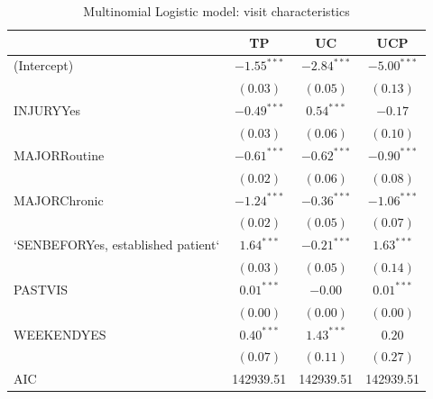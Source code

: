 \documentclass[12pt,twoside]{reedthesis}
\begin{document}
  \begin{table}
  \caption{Multinomial Logistic model: visit characteristics}
  \begin{center}
  \begin{scriptsize}
  \begin{tabular}{l@{} c@{} c@{} c@{} }
  \toprule
   & TP & UC & UCP \\
  \midrule
  (Intercept)                        & $\mathbf{-1.55}^{***}$ & $\mathbf{-2.84}^{***}$ & $\mathbf{-5.00}^{***}$ \\
                                     & $(0.03)$               & $(0.05)$               & $(0.13)$               \\
  INJURYYes                          & $\mathbf{-0.49}^{***}$ & $\mathbf{0.54}^{***}$  & $-0.17$                \\
                                     & $(0.03)$               & $(0.06)$               & $(0.10)$               \\
  MAJORRoutine                       & $\mathbf{-0.61}^{***}$ & $\mathbf{-0.62}^{***}$ & $\mathbf{-0.90}^{***}$ \\
                                     & $(0.02)$               & $(0.06)$               & $(0.08)$               \\
  MAJORChronic                       & $\mathbf{-1.24}^{***}$ & $\mathbf{-0.36}^{***}$ & $\mathbf{-1.06}^{***}$ \\
                                     & $(0.02)$               & $(0.05)$               & $(0.07)$               \\
  `SENBEFORYes, established patient` & $\mathbf{1.64}^{***}$  & $\mathbf{-0.21}^{***}$ & $\mathbf{1.63}^{***}$  \\
                                     & $(0.03)$               & $(0.05)$               & $(0.14)$               \\
  PASTVIS                            & $\mathbf{0.01}^{***}$  & $-0.00$                & $\mathbf{0.01}^{***}$  \\
                                     & $(0.00)$               & $(0.00)$               & $(0.00)$               \\
  WEEKENDYES                         & $\mathbf{0.40}^{***}$  & $\mathbf{1.43}^{***}$  & $0.20$                 \\
                                     & $(0.07)$               & $(0.11)$               & $(0.27)$               \\
  \midrule
  AIC                                & 142939.51              & 142939.51              & 142939.51              \\

\end{tabular}
\end{scriptsize}
\end{center}
\end{table}
\end{document}
